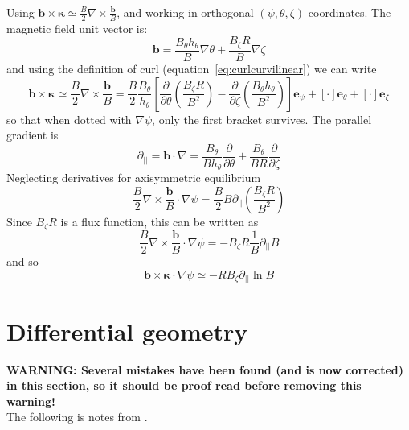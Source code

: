 \documentclass[12pt]{article}
\begin{document}
Using $\mathbf{b}\times\mathbf{\kappa} \simeq \frac{B}{2}\nabla\times\frac{\mathbf{b}}{B}$, and working
in orthogonal $\left(\psi, \theta, \zeta\right)$ coordinates. The magnetic field unit vector is:
\[
\mathbf{b} = \frac{B_\theta h_\theta}{B}\nabla\theta + \frac{B_\zeta R}{B}\nabla\zeta
\]
and using the definition of curl (equation~\ref{eq:curlcurvilinear}) we can write
\begin{equation}
\mathbf{b}\times\mathbf{\kappa} \simeq \frac{B}{2}\nabla\times\frac{\mathbf{b}}{B} = \frac{B}{2}\frac{B_\theta}{h_\theta}\left[\frac{\partial}{\partial\theta}\left(\frac{B_\zeta R}{B^2}\right) - \frac{\partial}{\partial\zeta}\left(\frac{B_\theta h_\theta}{B^2}\right)\right]\mathbf{e}_\psi + \left[\cdot\right]\mathbf{e}_\theta + \left[\cdot\right]\mathbf{e}_\zeta
\end{equation}
so that when dotted with $\nabla\psi$, only the first bracket survives.
The parallel gradient is
\[
\partial_{||} = \mathbf{b}\cdot\nabla = \frac{B_\theta}{Bh_\theta}\frac{\partial}{\partial\theta} + \frac{B_\theta}{BR}\frac{\partial}{\partial\zeta}
\]
Neglecting derivatives for axisymmetric equilibrium
\[
\frac{B}{2}\nabla\times\frac{\mathbf{b}}{B}\cdot\nabla\psi = \frac{B}{2}B\partial_{||}\left(\frac{B_\zeta R}{B^2}\right)
\]
Since $B_\zeta R$ is a flux function, this can be written as
\begin{equation}
\frac{B}{2}\nabla\times\frac{\mathbf{b}}{B}\cdot\nabla\psi = -B_\zeta R\frac{1}{B}\partial_{||} B
\end{equation}
and so
\begin{equation}
\mathbf{b}\times\mathbf{\kappa}\cdot\nabla\psi \simeq -RB_\zeta\partial_{||}\ln B
\end{equation}

%
 

\appendix





\section{Differential geometry}
%
{\color{red} \textbf{WARNING: Several mistakes have been found (and is now
corrected) in this section, so it should be proof read before removing this
warning!}}\\
%
The following is notes from \cite{haeseler-1}.
\end{document}

